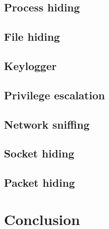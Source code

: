 \documentclass{article}
\begin{document}
\subsection{Process hiding}
\subsection{File hiding}
\subsection{Keylogger}
\subsection{Privilege escalation}
\subsection{Network sniffing}
\subsection{Socket hiding}
\subsection{Packet hiding}

\section{Conclusion}

\clearpage
\printbibliography
\end{document}
